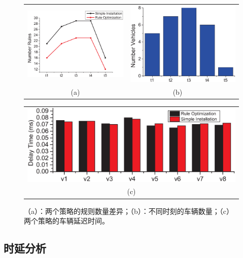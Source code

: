 \begin{figure} [t]
\begin{center}
\begin{tabular}{cc}
\includegraphics[width=0.5\columnwidth]{figures/fig-e-num-1.eps}&
\hspace {-0.2in}
\includegraphics[width=0.5\columnwidth]{figures/fig-e-num-2.eps} \\
(a) & (b)~~~
\end{tabular}
\begin{tabular}{c}
\includegraphics[width=0.9\columnwidth]{figures/fig-e-8bar-30.eps} \\
(c)
\end{tabular}
\caption{（a）：两个策略的规则数量差异；（b）：不同时刻的车辆数量；（c）两个策略的车辆延迟时间。} \label{fig8b}
  \end{center}
  \vspace{-0.35in}
\end{figure}

\subsection{时延分析}


